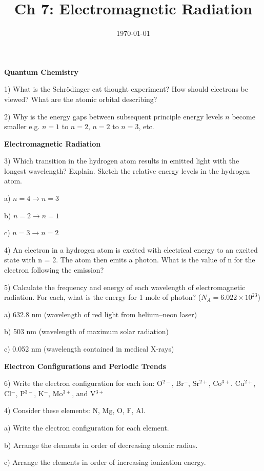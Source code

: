 \documentclass[12pt]{article}
\title{\textbf{Ch 7: Electromagnetic Radiation}}
\date{\today}
\begin{document}
\maketitle 

\textbf{Quantum Chemistry}

1) What is the Schr\"{o}dinger cat thought experiment? How should
electrons be viewed? What are the atomic orbital describing?
\vspace{1in}

2) Why is the energy gaps between subsequent principle energy levels
$n$ become smaller e.g. $n=1$ to $n=2$, $n=2$ to $n=3$, etc.
\vspace{1in}

\textbf{Electromagnetic Radiation}

3) Which transition in the hydrogen atom results in emitted light with
the longest wavelength? Explain. Sketch the relative energy levels in the
hydrogen atom.

a) $n = 4 \rightarrow n = 3$

b) $n = 2 \rightarrow n = 1$

c) $n = 3 \rightarrow n = 2$

4) An electron in a hydrogen atom is excited with electrical energy to
an excited state with n = 2. The atom then emits a photon. What is
the value of n for the electron following the emission?
\vspace{1in}

5) Calculate the frequency and energy of each wavelength of electromagnetic
radiation. For each, what is the energy for 1 mole of photon? ($N_A = 6.022\times 10^{23}$) 

a) 632.8 nm (wavelength of red light from helium–neon laser)

b) 503 nm (wavelength of maximum solar radiation)

c) 0.052 nm (wavelength contained in medical X-rays)

\textbf{Electron Configurations and Periodic Trends}

6) Write the electron configuration for each ion:
O$^{2-}$, Br$^-$, Sr$^{2+}$, Co$^{3+}$. Cu$^{2+}$, Cl$^-$, P$^{3-}$,
K$^-$, Mo$^{3+}$, and V$^{3+}$

4) Consider these elements: N, Mg, O, F, Al.

a) Write the electron configuration for each element.

b) Arrange the elements in order of decreasing atomic radius.

c) Arrange the elements in order of increasing ionization energy.
\end{document}
